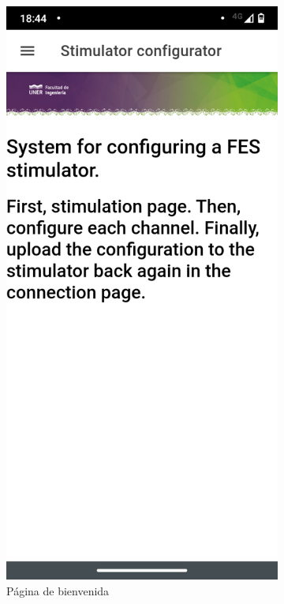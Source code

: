 \begin{figure}
\begin{subfigure}{.5\textwidth}
  \centering
  \includegraphics[width=.8\linewidth]{figs/01_start.png}
  \caption{Página de bienvenida}
  \label{fig:welcome}
\end{subfigure}%
\begin{subfigure}{.5\textwidth}
  \centering

\end{subfigure}
\end{figure}
